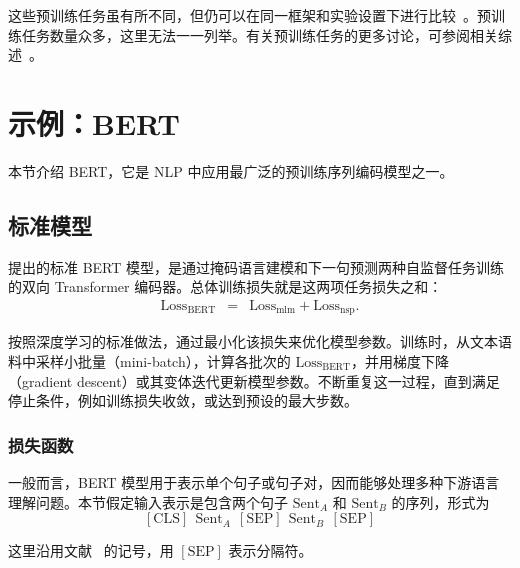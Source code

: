 这些预训练任务虽有所不同，但仍可以在同一框架和实验设置下进行比较~\cite{dong-etal:2019unified,raffel-etal:2020exploring,lewis-etal:2020bart}。预训练任务数量众多，这里无法一一列举。有关预训练任务的更多讨论，可参阅相关综述~\cite{qiu-etal:2020pre,han-etal:2021pre}。


\section{示例：BERT}

\noindent 本节介绍 BERT，它是 NLP 中应用最广泛的预训练序列编码模型之一。

\subsection{标准模型}

\noindent \citet{devlin-etal:2019bert} 提出的标准 BERT 模型，是通过掩码语言建模和下一句预测两种自监督任务训练的双向 Transformer 编码器。总体训练损失就是这两项任务损失之和：
\begin{eqnarray}
\mathrm{Loss}_{\mathrm{BERT}} & = & \mathrm{Loss}_{\mathrm{mlm}} + \mathrm{Loss}_{\mathrm{nsp}}.
\end{eqnarray}

\noindent 按照深度学习的标准做法，通过最小化该损失来优化模型参数。训练时，从文本语料中采样小批量（mini-batch），计算各批次的 $\mathrm{Loss}_{\mathrm{BERT}}$，并用梯度下降（gradient descent）或其变体迭代更新模型参数。不断重复这一过程，直到满足停止条件，例如训练损失收敛，或达到预设的最大步数。

\subsubsection{损失函数}

一般而言，BERT 模型用于表示单个句子或句子对，因而能够处理多种下游语言理解问题。本节假定输入表示是包含两个句子 $\mathrm{Sent}_{A}$ 和 $\mathrm{Sent}_{B}$ 的序列，形式为
\begin{equation}
\mathrm{[CLS]}\ \ \mathrm{Sent}_{A}\ \ \mathrm{[SEP]}\ \ \mathrm{Sent}_{B}\ \ \mathrm{[SEP]} \nonumber
\end{equation}

\noindent 这里沿用文献~\cite{devlin-etal:2019bert} 的记号，用 $\mathrm{[SEP]}$ 表示分隔符。

